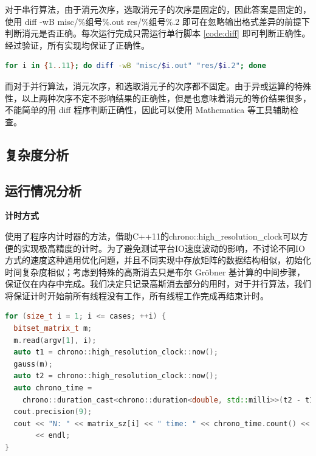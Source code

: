 \documentclass[a4paper]{article}
\begin{document}
对于串行算法，由于消元次序，选取消元子的次序是固定的，因此答案是固定的，使用 diff -wB misc/\%组号\%.out res/\%组号\%.2 即可在忽略输出格式差异的前提下判断消元是否正确。每次运行完成只需运行单行脚本 \ref{code:diff} 即可判断正确性。经过验证，所有实现均保证了正确性。
\begin{lstlisting}[frame=trbl, language={bash}, caption={单行 Bash 脚本}, label = {code:diff}]
  for i in {1..11}; do diff -wB "misc/$i.out" "res/$i.2"; done
\end{lstlisting}

而对于并行算法，消元次序，和选取消元子的次序都不固定。由于异或运算的特殊性，以上两种次序不定不影响结果的正确性，但是也意味着消元的等价结果很多，不能简单的用 diff 程序判断正确性，因此可以使用 Mathematica 等工具辅助检查。

\subsection{复杂度分析}

\subsection{运行情况分析}
\textbf{计时方式}

使用了程序内计时器的方法，借助C++11的chrono::high\_resolution\_clock可以方便的实现极高精度的计时。为了避免测试平台IO速度波动的影响，不讨论不同IO方式的速度这种通用优化问题，并且不同实现中存放矩阵的数据结构相似，初始化时间复杂度相似；考虑到特殊的高斯消去只是布尔 Gröbner 基计算的中间步骤，保证仅在内存中完成。我们决定只记录高斯消去部分的用时，对于并行算法，我们将保证计时开始前所有线程没有工作，所有线程工作完成再结束计时。

\begin{lstlisting}[frame=trbl, language={C++}, caption={计时器参考代码}, label={code:chrono}]
for (size_t i = 1; i <= cases; ++i) {
  bitset_matrix_t m;
  m.read(argv[1], i);
  auto t1 = chrono::high_resolution_clock::now();
  gauss(m);
  auto t2 = chrono::high_resolution_clock::now();
  auto chrono_time =
    chrono::duration_cast<chrono::duration<double, std::milli>>(t2 - t1);
  cout.precision(9);
  cout << "N: " << matrix_sz[i] << " time: " << chrono_time.count() << " ms"
       << endl;
}
\end{lstlisting}
\end{document}
